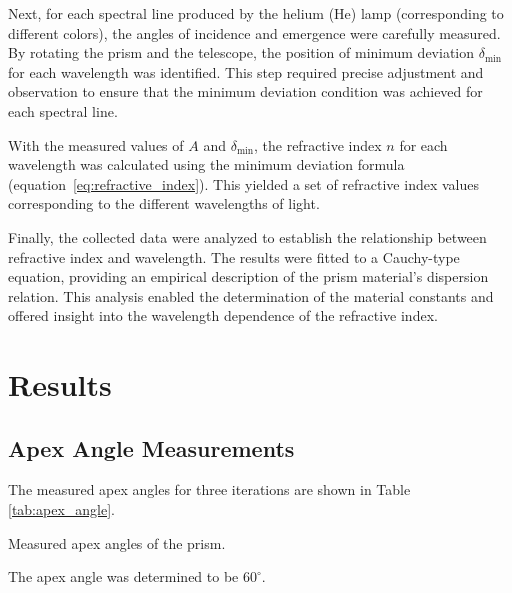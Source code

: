 \documentclass[journal]{IEEEtran}
\begin{document}
Next, for each spectral line produced by the helium (He) lamp (corresponding to different colors), the angles of incidence and emergence were carefully measured. By rotating the prism and the telescope, the position of minimum deviation \( \delta_{\min} \) for each wavelength was identified. This step required precise adjustment and observation to ensure that the minimum deviation condition was achieved for each spectral line.

With the measured values of \( A \) and \( \delta_{\min} \), the refractive index \( n \) for each wavelength was calculated using the minimum deviation formula (equation~\ref{eq:refractive_index}). This yielded a set of refractive index values corresponding to the different wavelengths of light.

Finally, the collected data were analyzed to establish the relationship between refractive index and wavelength. The results were fitted to a Cauchy-type equation, providing an empirical description of the prism material's dispersion relation. This analysis enabled the determination of the material constants and offered insight into the wavelength dependence of the refractive index.

\section{Results}
\subsection{Apex Angle Measurements}
The measured apex angles for three iterations are shown in Table \ref{tab:apex_angle}.

\begin{table}[H]
    \centering
    \caption{Measured apex angles of the prism.}
    \label{tab:apex_angle}
\end{table}

The apex angle was determined to be $60^\circ$.
\end{document}
